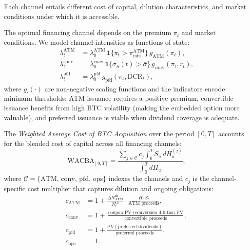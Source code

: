 Each channel entails different cost of capital, dilution characteristics,
and market conditions under which it is accessible.

\begin{proposition}\label{prop:channel_select}
The optimal financing channel depends on the premium $\pi_t$ and market
conditions.  We model channel intensities as functions of state:
\begin{align}
  \lambda_t^{\mathrm{ATM}} &= \lambda_0^{\mathrm{ATM}}\,
    \mathbf{1}\{\pi_t > \pi^{\mathrm{ATM}}_{\min}\}\,
    g_{\mathrm{ATM}}(\pi_t),
    \label{eq:lambda_atm}\\
  \lambda_t^{\mathrm{conv}} &= \lambda_0^{\mathrm{conv}}\,
    \mathbf{1}\{\sigma_S(t) > \bar\sigma\}\,
    g_{\mathrm{conv}}(\pi_t, r_t),
    \label{eq:lambda_conv}\\
  \lambda_t^{\mathrm{pfd}} &= \lambda_0^{\mathrm{pfd}}\,
    g_{\mathrm{pfd}}(\pi_t, \mathrm{DCR}_t),
    \label{eq:lambda_pfd}
\end{align}
where $g_{\cdot}(\cdot)$ are non-negative scaling functions and the
indicators encode minimum thresholds: ATM issuance requires a positive
premium, convertible issuance benefits from high BTC volatility (making
the embedded option more valuable), and preferred issuance is viable when
dividend coverage is adequate.
\end{proposition}

\begin{definition}%
\label{def:wacba}
The \emph{Weighted Average Cost of BTC Acquisition} over the period
$[0, T]$ accounts for the blended cost of capital across all financing
channels:
\begin{equation}\label{eq:wacba}
  \mathrm{WACBA}_{[0,T]}
  = \frac{\sum_{j \in \mathcal{C}}
          c_j \displaystyle\int_0^T S_u\,dH_u^{(j)}}
         {\displaystyle\int_0^T dH_u},
\end{equation}
where $\mathcal{C} = \{\mathrm{ATM},\,\mathrm{conv},\,\mathrm{pfd},\,
\mathrm{ops}\}$ indexes the channels and $c_j$ is the channel-specific
cost multiplier that captures dilution and ongoing obligations:
\begin{align}
  c_{\mathrm{ATM}} &= 1 + \frac{\Delta N^{\mathrm{sh}}_{\mathrm{ATM}}}
                               {N_t^{\mathrm{sh}}}\cdot
                         \frac{H_t\,S_t}{\text{ATM proceeds}},
                         \label{eq:c_atm}\\
  c_{\mathrm{conv}} &= 1 + \frac{\text{coupon PV} + \text{conversion dilution PV}}
                                {\text{convertible proceeds}},
                                \label{eq:c_conv}\\
  c_{\mathrm{pfd}} &= 1 + \frac{\mathrm{PV}(\text{preferred dividends})}
                               {\text{preferred proceeds}},
                               \label{eq:c_pfd}\\
  c_{\mathrm{ops}} &= 1. \label{eq:c_ops}
\end{align}
\end{definition}

